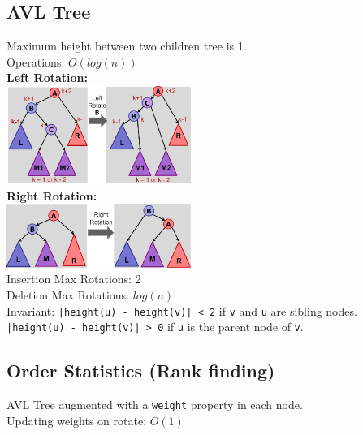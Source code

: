 \documentclass[10pt,landscape,a4paper]{article}
\begin{document}
\begin{multicols*}{4}
\subsection{AVL Tree}
Maximum height between two children tree is 1. \\
Operations: $O(log(n))$ \\
\textbf{Left Rotation:} \\
\includegraphics[width = 6cm]{left-rotate} \\
\textbf{Right Rotation:} \\
\includegraphics[width = 6cm]{right-rotate} \\
Insertion Max Rotations: 2 \\
Deletion Max Rotations: $log(n)$ \\
Invariant: \texttt{|height(u) - height(v)| < 2} if \texttt{v} and \texttt{u} are sibling nodes. \texttt{|height(u) - height(v)| > 0} if \texttt{u} is the parent node of \texttt{v}.
\subsection{Order Statistics (Rank finding)}
AVL Tree augmented with a \texttt{weight} property in each node. \\
Updating weights on rotate: $O(1)$ 



\end{multicols*}
\end{document}
